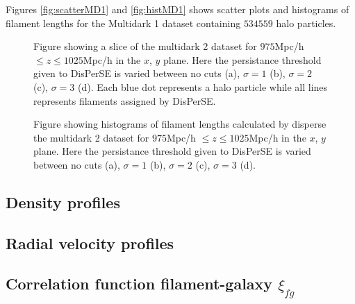 Figures \ref{fig:scatterMD1} and \ref{fig:histMD1} shows scatter plots and
histograms of filament lengths for the Multidark 1 dataset containing $534559$
halo particles.
\begin{figure}[htbp]
    \hspace{1em}%
    \hspace{1em}%
    \caption{Figure showing a slice of the multidark 2 dataset for $975$Mpc/h $\leq z\leq1025$Mpc/h in the $x$, $y$ plane. Here the persistance threshold given to DisPerSE is varied between no cuts (a), $\sigma=1$ (b), $\sigma=2$ (c), $\sigma=3$ (d). Each blue dot represents a halo particle while all lines represents filaments assigned by DisPerSE.}
\end{figure}
\begin{figure}[htbp]
    \hspace{1em}%
    \hspace{1em}%
    \caption{Figure showing histograms of filament lengths calculated by disperse the multidark 2 dataset for $975$Mpc/h $\leq z\leq1025$Mpc/h in the $x$, $y$ plane. Here the persistance threshold given to DisPerSE is varied between no cuts (a), $\sigma=1$ (b), $\sigma=2$ (c), $\sigma=3$ (d).}
\end{figure}
\subsection{Density profiles}
\subsection{Radial velocity profiles}
\subsection{Correlation function filament-galaxy $\xi_{fg}$}

